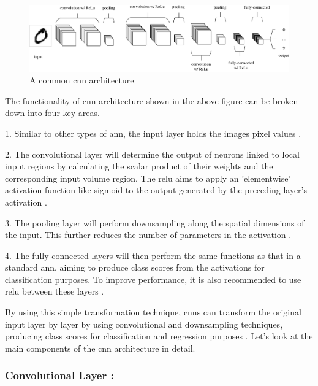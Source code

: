 \begin{figure}[ht!]
    \centering
    \includegraphics[width=1.1\linewidth]{Rohit_Master_Thesis//Images/cnn_architecture.pdf}
    \caption{A common \gls{cnn} architecture \cite{oshea2015introductionconvolutionalneuralnetworks}}
    \label{fig:cnn architecture}
\end{figure}

The functionality of \gls{cnn} architecture shown in the above figure can be broken down into four key areas.

1. Similar to other types of \gls{ann}, the input layer holds the images pixel values \cite{oshea2015introductionconvolutionalneuralnetworks}.

2. The convolutional layer will determine the output of neurons linked to local input regions by calculating the scalar product of their weights and the corresponding input volume region. The \gls{relu} aims to apply an 'elementwise' activation function like sigmoid to the output generated by the preceding layer's activation \cite{oshea2015introductionconvolutionalneuralnetworks}.

3. The pooling layer will perform downsampling along the spatial dimensions of the input. This further reduces the number of parameters in the activation \cite{oshea2015introductionconvolutionalneuralnetworks}.

4. The fully connected layers will then perform the same functions as that in a standard \gls{ann}, aiming to produce class scores from the activations for classification purposes. To improve performance, it is also recommended to use \gls{relu} between these layers \cite{oshea2015introductionconvolutionalneuralnetworks}. 

By using this simple transformation technique, \glspl{cnn} can transform the original input layer by layer by using convolutional and downsampling techniques, producing class scores for classification and regression purposes \cite{oshea2015introductionconvolutionalneuralnetworks}. Let's look at the main components of the \gls{cnn} architecture in detail.

\subsubsection*{Convolutional Layer :}


